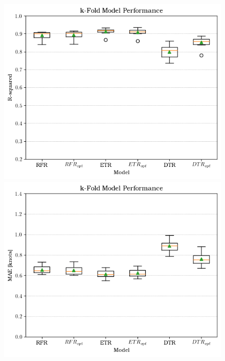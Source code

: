 \begin{figure}[ht]
    \centering
  
    \begin{minipage}{0.45\textwidth}
      \centering
      \includegraphics[width=\textwidth]{02_figures/kfold_r2_opt.png}
    \end{minipage}
    \hfill
    \begin{minipage}{0.45\textwidth}
      \centering
      \includegraphics[width=\textwidth]{02_figures/kfold_mae_opt.png}
    \end{minipage}
  

\end{figure}
